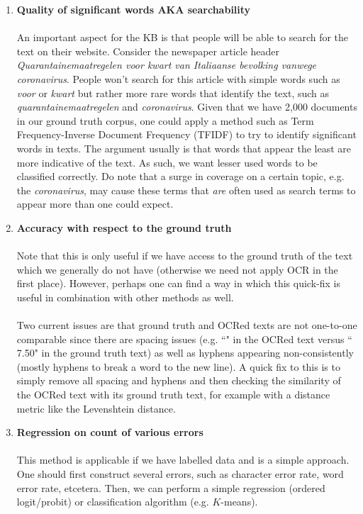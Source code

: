 \documentclass{article}
\begin{document}
\begin{enumerate}
		\item \textbf{Quality of significant words AKA searchability}
		\\ \\
		An important aspect for the KB is that people will be able to search for the text on their website. Consider the newspaper article header \textit{Quarantainemaatregelen voor kwart van Italiaanse bevolking vanwege coronavirus}. People won't search for this article with simple words such as \textit{voor} or \textit{kwart} but rather more rare words that identify the text, such as \textit{quarantainemaatregelen} and \textit{coronavirus}. Given that we have 2,000 documents in our ground truth corpus, one could apply a method such as Term Frequency-Inverse Document Frequency (TFIDF) to try to identify significant words in texts. The argument usually is that words that appear the least are more indicative of the text. As such, we want lesser used words to be classified correctly. Do note that a surge in coverage on a certain topic, e.g. the \textit{coronavirus}, may cause these terms that \textit{are} often used as search terms to appear more than one could expect.
		
		\newpage
		
		\item \textbf{Accuracy with respect to the ground truth}
		\\ \\
		Note that this is only useful if we have access to the ground truth of the text which we generally do not have (otherwise we need not apply OCR in the first place). However, perhaps one can find a way in which this quick-fix is useful in combination with other methods as well.
		\\ \\
		Two current issues are that ground truth and OCRed texts are not one-to-one comparable since there are spacing issues (e.g. ``" in the OCRed text versus ``\EUR{} 7.50" in the ground truth text) as well as hyphens appearing non-consistently (mostly hyphens to break a word to the new line). A quick fix to this is to simply remove all spacing and hyphens and then checking the similarity of the OCRed text with its ground truth text, for example with a distance metric like the Levenshtein distance.
		
		\item \textbf{Regression on count of various errors}
		\\ \\
		This method is applicable if we have labelled data and is a simple approach. One should first construct several errors, such as character error rate, word error rate, etcetera. Then, we can perform a simple regression (ordered logit/probit) or classification algorithm (e.g. $K$-means).
	\end{enumerate}	
	
	
	
	
\end{document}
